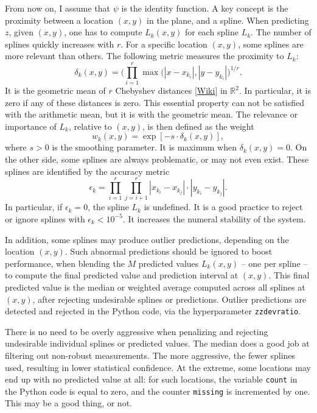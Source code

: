 \documentclass[oneside,10pt]{book}
\begin{document}
From now on, I assume that $\psi$ is the identity function. A key concept is the proximity between a location $(x,y)$ in the plane, and a spline. When predicting $z$, given $(x,y)$, one has to compute $L_k(x,y)$ for each spline $L_k$. The number of splines quickly increases with $r$. For a specific location $(x,y)$, some splines are more relevant than others. The following metric measures the proximity to $L_k$:
\begin{equation}
\delta_k(x,y)=\Big(\prod_{i=1}^r \max(|x-x_{k_i}|,|y-y_{k_i}|\Big)^{1/r} \label{feqab}.
\end{equation}
It is the geometric mean of $r$ Chebyshev distances [\href{https://en.wikipedia.org/wiki/Chebyshev_distance}{Wiki}] in $\mathbb{R}^2$. In particular, it is zero if any of these distances is zero. This essential property can not be satisfied with the arithmetic mean, but it is with the geometric mean. The relevance or importance of $L_k$, relative to $(x,y)$, is then defined as the weight
\begin{equation}\label{fuzze1}
w_k(x,y)=\exp[-s\cdot\delta_k(x,y)],
\end{equation}
where $s>0$ is the \textcolor{index}{smoothing parameter}. It is maximum when $\delta_k(x,y)=0$. On the other side, some splines are always problematic, or may not even exist. These splines are identified by the accuracy metric
\begin{equation}
\epsilon_k=\prod_{i=1}^r \prod_{j=i+1}^r|x_{k_i}-x_{k_j}|\cdot |y_{k_i}-y_{k_j}|.\label{eqfu7}
\end{equation}
In particular, if $\epsilon_k=0$, the spline $L_k$ is undefined. It is a good practice to reject or ignore splines with $\epsilon_k<10^{-5}$. It increases the numeral stability of the system.

In addition, some splines may produce outlier predictions, depending on the location $(x,y)$. Such abnormal predictions should be ignored to boost performance, when blending the $M$
predicted values $L_k(x,y)$ -- one per spline -- to compute the final predicted value and prediction interval at $(x,y)$. This final predicted value is the median or weighted average computed across all splines at $(x,y)$, after rejecting undesirable splines or predictions. Outlier predictions are detected and rejected in the Python code, via the
\textcolor{index}{hyperparameter} \texttt{zzdevratio}.

There is no need to be overly aggressive when penalizing and rejecting undesirable individual splines or predicted values. The median does a good job at filtering out non-robust
measurements. The more aggressive, the fewer splines used, resulting in lower statistical confidence. At the extreme, some locations may end up with no predicted value at all: for such locations, the variable \texttt{count} in the Python code is equal to zero, and the counter \texttt{missing} is incremented by one. This may be a good thing, or not.
\end{document}
